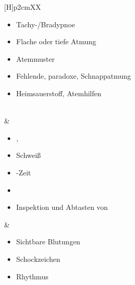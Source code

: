 \begin{WidePar}
\begin{tabularx}{\linewidth}[H]{p{2cm}XX}
\begin{minipage}[t]{\linewidth}
\begin{itemize}
  \item Tachy-/Bradypnoe
  \item Flache oder tiefe Atmung
  \item Atemmuster
  \item Fehlende, paradoxe, Schnappatmung 
  \item Heimsauerstoff, Atemhilfen
\end{itemize}
\end{minipage}
\\\addlinespace\midrule\addlinespace
{}
&
\begin{minipage}[t]{\linewidth}
\begin{itemize}
  \item {},  
  \item Schweiß
  \item {}-Zeit 
  \item {}
  \item[{\tiny\color{Indigo}\ovalbox{Trauma}}] Inspektion
  und Abtasten von
\end{itemize}
\end{minipage}
&
\noindent\color{darkBlue}\itshape\begin{minipage}[t]{\linewidth}
\begin{itemize}
  \item Sichtbare Blutungen
  \item Schockzeichen
  \item Rhythmus 
  

\end{itemize}
\end{minipage}
\end{tabularx}
\end{WidePar}
